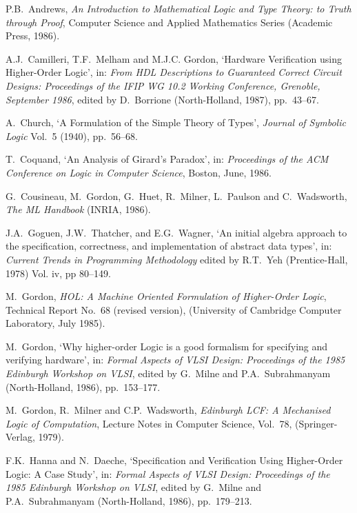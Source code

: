 \begin{thebibliography}{99}

P\/.B\/.~Andrews,
{\it An Introduction to Mathematical Logic
     and Type Theory: to Truth through Proof},
Computer Science and Applied Mathematics Series
(Academic Press, 1986).

A.J.\ Camilleri, T\/.F\/.\ Melham and M.J.C. Gordon,
`Hardware Verification using Higher-Order Logic',
in: {\it From HDL Descriptions to Guaranteed Correct \mbox{Circuit}
Designs: Proceedings of the IFIP WG 10.2 Working Conference, Grenoble,
September 1986}, edited by D.\ Borrione (North-Holland, 1987), pp.\ 43--67.

A.\ Church,
`{}A Formulation of the Simple Theory of Types',
{\it Journal of Symbolic Logic} Vol.\ 5 (1940), pp.\ 56--68.

T{}.\ Coquand, `{}An Analysis of Girard's Paradox',
in: {\it Proceedings of the ACM Conference on
Logic in Computer Science\/}, Boston, June, 1986.

G.\ Cousineau, M.\ Gordon, G.\ Huet, R.\ Milner,
L.\ Paulson and C.\ Wadsworth,
{\it The ML Handbook} ({\small INRIA}, 1986).

J.A.\ Goguen, J.W.\ Thatcher, and E.G.\ Wagner,
`{}An initial algebra \mbox{approach} to the specification,
correctness, and implementation of abstract data types',
in: {\it Current Trends in Programming Methodology\/}
edited by R.T{}.\ Yeh (Prentice-Hall, 1978)
Vol. {\sc iv}, pp 80--149.

M.\ Gordon,
{\it HOL: A Machine Oriented Formulation of Higher-Order Logic},
Technical Report No.\ 68 (revised version),
(University of Cambridge Computer Laboratory, July 1985).

M.\ Gordon,
`Why higher-order Logic
is a good formalism for specifying and verifying hardware',
in: {\it Formal Aspects of VLSI Design: Proceedings of the 1985 Edinburgh
      Workshop on VLSI\/}, edited by G.\ Milne and
P.A.\ Subrahmanyam (North-Holland, 1986), pp.\ 153--177.

M.\ Gordon, R.\ Milner and C.P\/.\ Wadsworth,
{\it Edinburgh LCF: A Mechanised Logic of Computation},
Lecture Notes in Computer Science, Vol.\ 78,
(Springer-Verlag, 1979).

F{}.K.\ Hanna and N.\ Daeche,
`Specification and Verification Using Higher-Order Logic: A Case Study',
in: {\it Formal Aspects of VLSI Design: Proceedings of the 1985 Edinburgh
      Workshop on VLSI\/}, edited by G.\ Milne and
P.A.\ Subrahmanyam (North-Holland, 1986), pp.\ 179--213.


\end{thebibliography}

